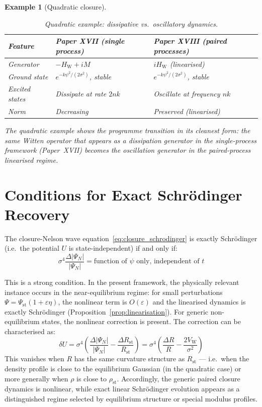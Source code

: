 \documentclass[12pt]{article}
\newtheorem{example}[theorem]{Example}
\newcommand{\VW}{V_{\mathrm{W}}}
\begin{document}
\begin{example}[Quadratic closure]
\begin{table}[ht]
\centering
\caption{Quadratic example: dissipative vs.\ oscillatory dynamics.}
\label{tab:comparison}
\begin{tabular}{@{}lll@{}}
\toprule
Feature & Paper XVII (single process) & Paper XVIII (paired processes) \\
\midrule
Generator & $-H_{\mathrm{W}} + iM$ & $iH_{\mathrm{W}}$ (linearised) \\
Ground state & $e^{-k\psi^2/(2\sigma^2)}$, stable & $e^{-k\psi^2/(2\sigma^2)}$, stable \\
Excited states & Dissipate at rate $2nk$ & Oscillate at frequency $nk$ \\
Norm & Decreasing & Preserved (linearised) \\
\bottomrule
\end{tabular}
\end{table}

The quadratic example shows the programme transition in its cleanest form: the same Witten operator that appears as a dissipation generator in the single-process framework (Paper~XVII) becomes the oscillation generator in the paired-process linearised regime.
\end{example}

\section{Conditions for Exact Schr\"odinger Recovery}\label{sec:conditions}

The closure-Nelson wave equation~\eqref{eq:closure_schrodinger} is exactly Schr\"odinger (i.e.\ the potential $U$ is state-independent) if and only if:
\begin{equation}
    \sigma^4\frac{\Delta|\Psi_N|}{|\Psi_N|} = \text{function of $\psi$ only, independent of $t$}
\end{equation}

This is a strong condition. In the present framework, the physically relevant instance occurs in the near-equilibrium regime: for small perturbations $\Psi = \Psi_{\mathrm{st}}(1 + \varepsilon\eta)$, the nonlinear term is $O(\varepsilon)$ and the linearised dynamics is exactly Schr\"odinger (Proposition~\ref{prop:linearisation}). For generic non-equilibrium states, the nonlinear correction is present. The correction can be characterised as:
\begin{equation}
    \delta U = \sigma^4\left(\frac{\Delta|\Psi_N|}{|\Psi_N|} - \frac{\Delta R_{\mathrm{st}}}{R_{\mathrm{st}}}\right) = \sigma^4\left(\frac{\Delta R}{R} - \frac{2\VW}{\sigma^2}\right)
\end{equation}
This vanishes when $R$ has the same curvature structure as $R_{\mathrm{st}}$ --- i.e.\ when the density profile is close to the equilibrium Gaussian (in the quadratic case) or more generally when $\rho$ is close to $\rho_{\mathrm{st}}$. Accordingly, the generic paired closure dynamics is nonlinear, while exact linear Schr\"odinger evolution appears as a distinguished regime selected by equilibrium structure or special modulus profiles.
\end{document}
